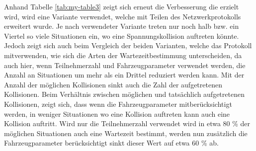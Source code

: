 Anhand Tabelle \ref{tab:my-table3} zeigt sich erneut die Verbesserung die erzielt wird, wird eine Variante verwendet, welche mit Teilen des Netzwerkprotokolls erweitert wurde. Je nach verwendeter Variante treten nur noch halb bzw. ein Viertel so viele Situationen ein, wo eine Spannungskollision auftreten könnte. Jedoch zeigt sich auch beim Vergleich der beiden Varianten, welche das Protokoll mitverwenden, wie sich die Arten der Wartezeitbestimmung unterscheiden, da auch hier, wenn Teilnehmerzahl und Fahrzeugparameter verwendet werden, die Anzahl an Situationen um mehr als ein Drittel reduziert werden kann. Mit der Anzahl der möglichen Kollisionen sinkt auch die Zahl der aufgetretenen Kollisionen. Beim Verhältnis zwischen möglichen und tatsächlich aufgetretenen Kollisionen, zeigt sich, dass wenn die Fahrzeugparameter mitberücksichtigt werden, in weniger Situationen wo eine Kollision auftreten kann auch eine Kollision auftritt. Wird nur die Teilnehmerzahl verwendet wird in etwa 80 \% der möglichen Situationen auch eine Wartezeit bestimmt, werden nun zusätzlich die Fahrzeugparameter berücksichtigt sinkt dieser Wert auf etwa 60 \% ab. 
